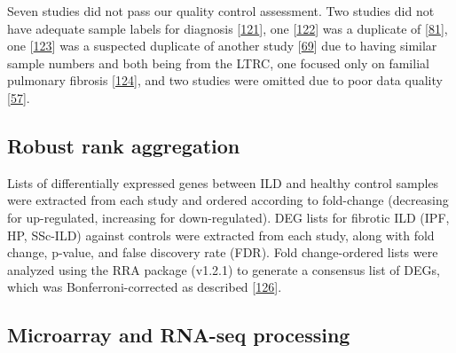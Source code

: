 \documentclass[
]{article}
\begin{document}
Seven studies did not pass our quality control assessment. Two studies did not have adequate sample labels for diagnosis {[}\protect\hyperlink{ref-zhu_integration_2018}{121}{]}, one {[}\protect\hyperlink{ref-christmann_association_2014}{122}{]} was a duplicate of {[}\protect\hyperlink{ref-christmann_mir-155_2016}{81}{]}, one {[}\protect\hyperlink{ref-ghosh_lung_2022}{123}{]} was a suspected duplicate of another study {[}\protect\hyperlink{ref-borie_colocalization_2022}{69}{]} due to having similar sample numbers and both being from the LTRC, one focused only on familial pulmonary fibrosis {[}\protect\hyperlink{ref-el-chemaly_immunome_2018}{124}{]}, and two studies were omitted due to poor data quality {[}\protect\hyperlink{ref-jia_interleukin_2023}{57}{]}.

\hypertarget{robust-rank-aggregation}{%
\subsection{Robust rank aggregation}\label{robust-rank-aggregation}}

Lists of differentially expressed genes between ILD and healthy control samples were extracted from each study and ordered according to fold-change (decreasing for up-regulated, increasing for down-regulated). DEG lists for fibrotic ILD (IPF, HP, SSc-ILD) against controls were extracted from each study, along with fold change, p-value, and false discovery rate (FDR). Fold change-ordered lists were analyzed using the RRA package (v1.2.1) to generate a consensus list of DEGs, which was Bonferroni-corrected as described {[}\protect\hyperlink{ref-vosa_comprehensive_2014}{126}{]}.

\hypertarget{microarray-and-rna-seq-processing}{%
\subsection{Microarray and RNA-seq processing}\label{microarray-and-rna-seq-processing}}
\end{document}

